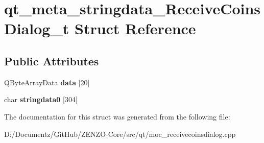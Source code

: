 \hypertarget{structqt__meta__stringdata___receive_coins_dialog__t}{}\section{qt\+\_\+meta\+\_\+stringdata\+\_\+\+Receive\+Coins\+Dialog\+\_\+t Struct Reference}
\label{structqt__meta__stringdata___receive_coins_dialog__t}
\subsection*{Public Attributes}
\begin{DoxyCompactItemize}
\item 
\mbox{\label{structqt__meta__stringdata___receive_coins_dialog__t_a0393757a740a4374e198b64083bd91d6}} 
Q\+Byte\+Array\+Data {\bfseries data} \mbox{[}20\mbox{]}
\item 
\mbox{\label{structqt__meta__stringdata___receive_coins_dialog__t_a3dda2160eb90c8e89f729d1a5d7617f0}} 
char {\bfseries stringdata0} \mbox{[}304\mbox{]}
\end{DoxyCompactItemize}


The documentation for this struct was generated from the following file\+:\begin{DoxyCompactItemize}
\item 
D\+:/\+Documentz/\+Git\+Hub/\+Z\+E\+N\+Z\+O-\/\+Core/src/qt/moc\+\_\+receivecoinsdialog.\+cpp\end{DoxyCompactItemize}

